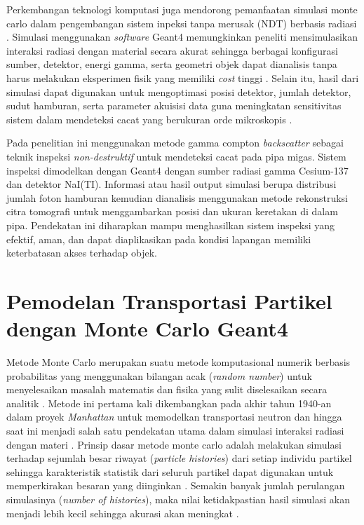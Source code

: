 \documentclass[12pt,a4paper]{report}
\begin{document}
Perkembangan teknologi komputasi juga mendorong pemanfaatan simulasi monte carlo dalam pengembangan sistem inpeksi tanpa merusak (NDT) berbasis radiasi \cite{qin2023study}. Simulasi menggunakan \textit{software} Geant4 memungkinkan peneliti mensimulasikan interaksi radiasi dengan material secara akurat sehingga berbagai konfigurasi sumber, detektor, energi gamma, serta geometri objek dapat dianalisis tanpa harus melakukan eksperimen fisik yang memiliki \textit{cost} tinggi \cite{agostinelli2003geant4}. Selain itu, hasil dari simulasi dapat digunakan untuk 
mengoptimasi posisi detektor, jumlah detektor, sudut hamburan, serta parameter akuisisi data guna meningkatan sensitivitas sistem dalam mendeteksi cacat yang berukuran orde mikroskopis \cite{qin2023study}.

Pada penelitian ini menggunakan metode gamma compton \textit{backscatter} sebagai teknik inspeksi \textit{non-destruktif} untuk mendeteksi cacat pada pipa migas. Sistem inspeksi dimodelkan dengan Geant4 dengan sumber radiasi gamma Cesium-137 dan detektor NaI(TI). Informasi atau hasil output simulasi berupa distribusi jumlah foton hamburan kemudian dianalisis menggunakan metode rekonstruksi citra tomografi untuk menggambarkan posisi dan ukuran keretakan di dalam pipa. Pendekatan ini diharapkan mampu menghasilkan 
sistem inspeksi yang efektif, aman, dan dapat diaplikasikan pada kondisi lapangan memiliki keterbatasan akses terhadap objek.

\section{Pemodelan Transportasi Partikel dengan Monte Carlo Geant4}

Metode Monte Carlo merupakan suatu metode komputasional numerik berbasis probabilitas yang menggunakan bilangan acak (\textit{random number}) untuk menyelesaikan masalah matematis dan fisika yang sulit diselesaikan secara analitik \cite{agma2025simulasi}. Metode ini pertama kali dikembangkan pada akhir tahun 1940-an dalam proyek \textit{Manhattan} untuk memodelkan transportasi neutron dan hingga saat ini menjadi salah satu pendekatan utama dalam simulasi interaksi radiasi dengan materi \cite{sood2021neutronics}. Prinsip dasar metode monte carlo adalah melakukan 
simulasi terhadap sejumlah besar riwayat (\textit{particle histories}) dari setiap individu partikel sehingga karakteristik statistik dari seluruh partikel dapat digunakan untuk memperkirakan besaran yang diinginkan \cite{agma2025simulasi}. Semakin banyak jumlah perulangan simulasinya (\textit{number of histories}), maka nilai ketidakpastian hasil simulasi akan menjadi lebih kecil sehingga akurasi akan meningkat \cite{agma2025simulasi}.
\end{document}
